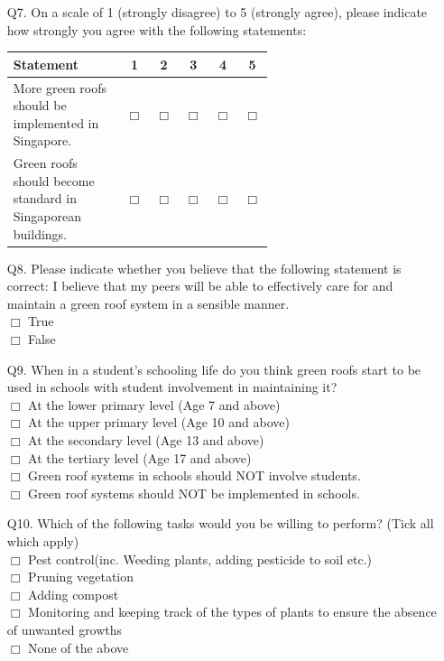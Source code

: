 \documentclass[a4paper]{article}
\begin{document}
\begin{appendices}
\begin{itemize}
    \item[Q7.] On a scale of 1 (strongly disagree) to 5 (strongly agree),
      please indicate how strongly you agree with the following statements:
      \begin{table}[H]
        \begin{tabular}{|p{0.6\linewidth}|c|c|c|c|c|}
          \hline
          Statement & 1 & 2 & 3 & 4 &
          5 \\ \hline

          More green roofs should be implemented in Singapore. &
          $\Box$ & $\Box$ & $\Box$ & $\Box$ & $\Box$ \\ \hline

          Green roofs should become standard in Singaporean buildings. &
          $\Box$ & $\Box$ & $\Box$ & $\Box$ & $\Box$ \\ \hline
        \end{tabular}
      \end{table}

    \item[Q8.] Please indicate whether you believe that the following
      statement is correct: I believe that my peers will be able to
      effectively care for and maintain a green roof system in a sensible
      manner. \\ $\Box$ True \\ $\Box$ False

    \item[Q9.] When in a student’s schooling life do you think
      green roofs start to be used in schools with student involvement
      in maintaining it? \\ $\Box$ At the lower primary level (Age 7 and
      above) \\ $\Box$ At the upper primary level (Age 10 and above) \\
      $\Box$ At the secondary level (Age 13 and above) \\ $\Box$ At the
      tertiary level (Age 17 and above) \\ $\Box$ Green roof systems in
      schools should NOT involve students. \\ $\Box$ Green roof systems
      should NOT be implemented in schools.

    \item[Q10.] Which of the following tasks would you be willing to
      perform? (Tick all which apply) \\ $\Box$ Pest control(inc. Weeding
      plants, adding pesticide to soil etc.) \\ $\Box$ Pruning vegetation
      \\ $\Box$ Adding compost \\ $\Box$ Monitoring and keeping track of
      the types of plants to ensure the absence of unwanted growths \\
      $\Box$ None of the above


\end{itemize}
\end{appendices}
\end{document}
